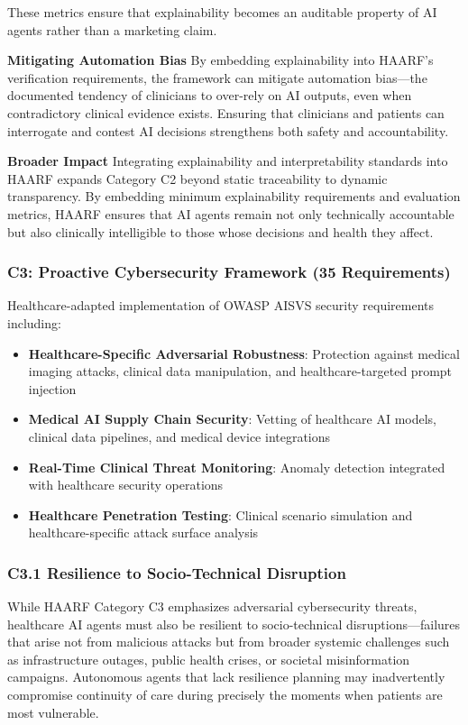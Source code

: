 \documentclass[11pt]{article}
\begin{document}
These metrics ensure that explainability becomes an auditable property of AI agents rather than a marketing claim.

\textbf{Mitigating Automation Bias}  
By embedding explainability into HAARF’s verification requirements, the framework can mitigate automation bias—the documented tendency of clinicians to over-rely on AI outputs, even when contradictory clinical evidence exists. Ensuring that clinicians and patients can interrogate and contest AI decisions strengthens both safety and accountability.

\textbf{Broader Impact}  
Integrating explainability and interpretability standards into HAARF expands Category C2 beyond static traceability to dynamic transparency. By embedding minimum explainability requirements and evaluation metrics, HAARF ensures that AI agents remain not only technically accountable but also clinically intelligible to those whose decisions and health they affect.


\subsubsection{C3: Proactive Cybersecurity Framework (35 Requirements)}

Healthcare-adapted implementation of OWASP AISVS security requirements including:

\begin{itemize}
    \item \textbf{Healthcare-Specific Adversarial Robustness}: Protection against medical imaging attacks, clinical data manipulation, and healthcare-targeted prompt injection
    \item \textbf{Medical AI Supply Chain Security}: Vetting of healthcare AI models, clinical data pipelines, and medical device integrations
    \item \textbf{Real-Time Clinical Threat Monitoring}: Anomaly detection integrated with healthcare security operations
    \item \textbf{Healthcare Penetration Testing}: Clinical scenario simulation and healthcare-specific attack surface analysis
\end{itemize}

\subsubsection{C3.1 Resilience to Socio-Technical Disruption}

While HAARF Category C3 emphasizes adversarial cybersecurity threats, healthcare AI agents must also be resilient to socio-technical disruptions—failures that arise not from malicious attacks but from broader systemic challenges such as infrastructure outages, public health crises, or societal misinformation campaigns. Autonomous agents that lack resilience planning may inadvertently compromise continuity of care during precisely the moments when patients are most vulnerable.
\end{document}
